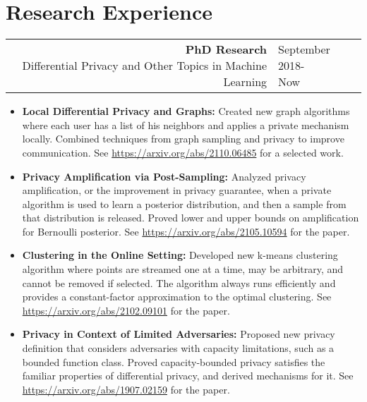 \documentclass[11pt]{article}
\newcommand{\datewidth}{0.2\textwidth}
\newcommand{\descwidth}{0.755\textwidth}
\begin{document}
\section*{Research Experience}
\begin{tabular}{rl}
\parbox[t][][t]{\descwidth}{
  \textbf{PhD Research} \\
  Differential Privacy and Other Topics in Machine Learning
} &
\parbox[t][][t]{\datewidth}{
  \raggedleft September 2018-\\Now
}%
\end{tabular}
\begin{itemize}
  \item \textbf{Local Differential Privacy and Graphs:} Created new
    graph algorithms where each user has a list of his neighbors and 
    applies a private mechanism locally. Combined techniques from
    graph sampling and privacy to improve communication. See
    \url{https://arxiv.org/abs/2110.06485} for a selected work.
    
  \item \textbf{Privacy Amplification via Post-Sampling:} Analyzed
    privacy amplification, or the improvement in privacy guarantee,
    when a private algorithm is used to learn a posterior distribution,
    and then a sample from that distribution is released. Proved
    lower and upper bounds on amplification for Bernoulli posterior. 
    See \url{https://arxiv.org/abs/2105.10594} for the paper.

  \item \textbf{Clustering in the Online Setting:} Developed new k-means
    clustering algorithm where points are streamed one at a time, may be
    arbitrary, and cannot be removed if selected. The algorithm 
    always runs efficiently and provides a constant-factor approximation 
    to the optimal clustering. See \url{https://arxiv.org/abs/2102.09101}
    for the paper.

  \item \textbf{Privacy in Context of Limited Adversaries:} Proposed new 
    privacy definition that considers adversaries with capacity limitations,
    such as a bounded function class. Proved capacity-bounded privacy satisfies
    the familiar properties of differential privacy, and derived mechanisms for
    it. See \url{https://arxiv.org/abs/1907.02159} for the paper.

\end{itemize}

\medskip
\end{document}
